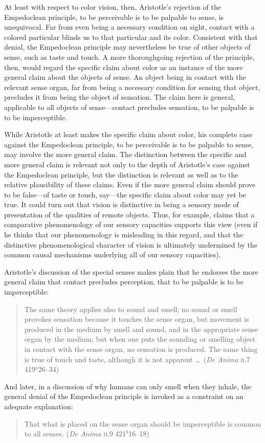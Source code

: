 At least with respect to color vision, then, Aristotle's rejection of the Empedoclean principle, to be perceivable is to be palpable to sense, is unequivocal. Far from even being a necessary condition on sight, contact with a colored particular blinds us to that particular and its color. Consistent with that denial, the Empedoclean principle may nevertheless be true of other objects of sense, such as taste and touch. A more thoroughgoing rejection of the principle, then, would regard the specific claim about color as an instance of the more general claim about the objects of sense. An object being in contact with the relevant sense organ, far from being a necessary condition for sensing that object, precludes it from being the object of sensation. The claim here is general, applicable to all objects of sense---contact precludes sensation, to be palpable is to be imperceptible.

While Aristotle at least makes the specific claim about color, his complete case against the Empedoclean principle, to be perceivable is to be palpable to sense, may involve the more general claim. The distinction between the specific and more general claim is relevant not only to the depth of Aristotle's case against the Empedoclean principle, but the distinction is relevant as well as to the relative plausibility of these claims. Even if the more general claim should prove to be false---of taste or touch, say---the specific claim about color may yet be true. It could turn out that vision is distinctive in being a sensory mode of presentation of the qualities of remote objects. Thus, for example, \citet[]{Broad:1952kx} claims that a comparative phenomenology of our sensory capacities supports this view (even if he thinks that our phenomenology is misleading in this regard, and that the distinctive phenomenological character of vision is ultimately undermined by the common causal mechanisms underlying all of our sensory capacities).

Aristotle's discussion of the special senses makes plain that he endorses the more general claim that contact precludes perception, that to be palpable is to be imperceptible:
\begin{quote}
	The same theory applies also to sound and smell; no sound or smell provokes sensation because it touches the sense organ, but movement is produced in the medium by smell and sound, and in the appropriate sense organ by the medium; but when one puts the sounding or smelling object in contact with the sense organ, no sensation is produced. The same thing is true of touch and taste, although it is not apparent \ldots\ (\emph{De Anima} \textsc{ii}.7 419\( ^{a} \)26--34)
\end{quote}
And later, in a discussion of why humans can only smell when they inhale, the general denial of the Empedoclean principle is invoked as a constraint on an adequate explanation:
\begin{quote}
	That what is placed on the sense organ should be imperceptible is common to all senses. (\emph{De Anima} \textsc{ii}.9 421\( ^{b} \)16--18)
\end{quote}

